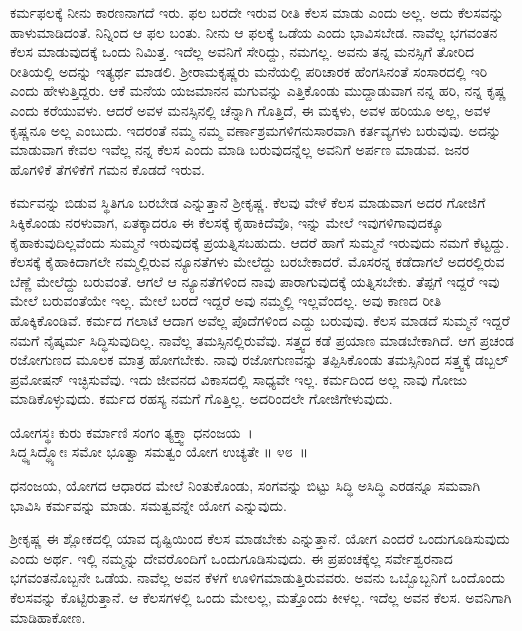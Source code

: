 ಕರ್ಮಫಲಕ್ಕೆ ನೀನು ಕಾರಣನಾಗದೆ ಇರು. ಫಲ ಬರದೇ ಇರುವ ರೀತಿ ಕೆಲಸ ಮಾಡು ಎಂದು ಅಲ್ಲ. ಅದು ಕೆಲಸವನ್ನು ಹಾಳುಮಾಡಿದಂತೆ. ನಿನ್ನಿಂದ ಆ ಫಲ ಬಂತು. ನೀನು ಆ ಫಲಕ್ಕೆ ಒಡೆಯ ಎಂದು ಭಾವಿಸಬೇಡ. ನಾವೆಲ್ಲ ಭಗವಂತನ ಕೆಲಸ ಮಾಡುವುದಕ್ಕೆ ಒಂದು ನಿಮಿತ್ತ. ಇದೆಲ್ಲ ಅವನಿಗೆ ಸೇರಿದ್ದು, ನಮಗಲ್ಲ. ಅವನು ತನ್ನ ಮನಸ್ಸಿಗೆ ತೋರಿದ ರೀತಿಯಲ್ಲಿ ಅದನ್ನು ಇತ್ಯರ್ಥ ಮಾಡಲಿ. ಶ‍್ರೀರಾಮಕೃಷ್ಣರು ಮನೆಯಲ್ಲಿ ಪರಿಚಾರಕ ಹೆಂಗಸಿನಂತೆ ಸಂಸಾರದಲ್ಲಿ ಇರಿ ಎಂದು ಹೇಳುತ್ತಿದ್ದರು. ಆಕೆ ಮನೆಯ ಯಜಮಾನನ ಮಗುವನ್ನು ಎತ್ತಿಕೊಂಡು ಮುದ್ದಾಡುವಾಗ ನನ್ನ ಹರಿ, ನನ್ನ ಕೃಷ್ಣ ಎಂದು ಕರೆಯುವಳು. ಆದರೆ ಅವಳ ಮನಸ್ಸಿನಲ್ಲಿ ಚೆನ್ನಾಗಿ ಗೊತ್ತಿದೆ, ಈ ಮಕ್ಕಳು, ಅವಳ ಹರಿಯೂ ಅಲ್ಲ, ಅವಳ ಕೃಷ್ಣನೂ ಅಲ್ಲ ಎಂಬುದು. ಇದರಂತೆ ನಮ್ಮ ನಮ್ಮ ವರ್ಣಾಶ್ರಮಗಳಿಗನುಸಾರವಾಗಿ ಕರ್ತವ್ಯಗಳು ಬರುವುವು. ಅದನ್ನು ಮಾಡುವಾಗ ಕೇವಲ ಇವೆಲ್ಲ ನನ್ನ ಕೆಲಸ ಎಂದು ಮಾಡಿ ಬರುವುದನ್ನೆಲ್ಲ ಅವನಿಗೆ ಅರ್ಪಣ ಮಾಡುವ. ಜನರ ಹೊಗಳಿಕೆ ತೆಗಳಿಕೆಗೆ ಗಮನ ಕೊಡದೆ ಇರುವ.

ಕರ್ಮವನ್ನು ಬಿಡುವ ಸ್ಥಿತಿಗೂ ಬರಬೇಡ ಎನ್ನುತ್ತಾನೆ ಶ‍್ರೀಕೃಷ್ಣ. ಕೆಲವು ವೇಳೆ ಕೆಲಸ ಮಾಡುವಾಗ ಅದರ ಗೋಜಿಗೆ ಸಿಕ್ಕಿಕೊಂಡು ನರಳುವಾಗ, ಏತಕ್ಕಾದರೂ ಈ ಕೆಲಸಕ್ಕೆ ಕೈಹಾಕಿದೆವೊ, ಇನ್ನು ಮೇಲೆ ಇವುಗಳಿಗಾವುದಕ್ಕೂ ಕೈಹಾಕುವುದಿಲ್ಲವೆಂದು ಸುಮ್ಮನೆ ಇರುವುದಕ್ಕೆ ಪ್ರಯತ್ನಿಸಬಹುದು. ಆದರೆ ಹಾಗೆ ಸುಮ್ಮನೆ ಇರುವುದು ನಮಗೆ ಕೆಟ್ಟದ್ದು. ಕೆಲಸಕ್ಕೆ ಕೈಹಾಕಿದಾಗಲೇ ನಮ್ಮಲ್ಲಿರುವ ನ್ಯೂನತೆಗಳು ಮೇಲೆದ್ದು ಬರಬೇಕಾದರೆ. ಮೊಸರನ್ನ ಕಡೆದಾಗಲೆ ಅದರಲ್ಲಿರುವ ಬೆಣ್ಣೆ ಮೇಲೆದ್ದು ಬರುವಂತೆ. ಆಗಲೆ ಆ ನ್ಯೂನತೆಗಳಿಂದ ನಾವು ಪಾರಾಗುವುದಕ್ಕೆ ಯತ್ನಿಸಬೇಕು. ತೆಪ್ಪಗೆ ಇದ್ದರೆ ಇವು ಮೇಲೆ ಬರುವಂತೆಯೇ ಇಲ್ಲ. ಮೇಲೆ ಬರದೆ ಇದ್ದರೆ ಅವು ನಮ್ಮಲ್ಲಿ ಇಲ್ಲವೆಂದಲ್ಲ. ಅವು ಕಾಣದ ರೀತಿ ಹೊಕ್ಕಿಕೊಂಡಿವೆ. ಕರ್ಮದ ಗಲಾಟೆ ಆದಾಗ ಅವೆಲ್ಲ ಪೊದೆಗಳಿಂದ ಎದ್ದು ಬರುವುವು. ಕೆಲಸ ಮಾಡದೆ ಸುಮ್ಮನೆ ಇದ್ದರೆ ನಮಗೆ ನೈಷ್ಕರ್ಮ ಸಿದ್ಧಿಸುವುದಿಲ್ಲ. ನಾವೆಲ್ಲ ತಮಸ್ಸಿನಲ್ಲಿರುವೆವು. ಸತ್ತ್ವದ ಕಡೆ ಪ್ರಯಾಣ ಮಾಡಬೇಕಾಗಿದೆ. ಆಗ ಪ್ರಚಂಡ ರಜೋಗುಣದ ಮೂಲಕ ಮಾತ್ರ ಹೋಗಬೇಕು. ನಾವು ರಜೋಗುಣವನ್ನು ತಪ್ಪಿಸಿಕೊಂಡು ತಮಸ್ಸಿನಿಂದ ಸತ್ತ್ವಕ್ಕೆ ಡಬ್ಬಲ್ ಪ್ರಮೋಷನ್ ಇಚ್ಛಿಸುವೆವು. ಇದು ಜೀವನದ ವಿಕಾಸದಲ್ಲಿ ಸಾಧ್ಯವೇ ಇಲ್ಲ. ಕರ್ಮದಿಂದ ಅಲ್ಲ ನಾವು ಗೋಜು ಮಾಡಿಕೊಳ್ಳುವುದು. ಕರ್ಮದ ರಹಸ್ಯ ನಮಗೆ ಗೊತ್ತಿಲ್ಲ. ಅದರಿಂದಲೇ ಗೋಜಿಗೇಳುವುದು.

\begin{shloka}
ಯೋಗಸ್ಥಃ ಕುರು ಕರ್ಮಾಣಿ ಸಂಗಂ ತ್ಯಕ್ತ್ವಾ ಧನಂಜಯ~।\\ಸಿದ್ಧ್ಯಸಿದ್ಧ್ಯೋಃ ಸಮೋ ಭೂತ್ವಾ ಸಮತ್ವಂ ಯೋಗ ಉಚ್ಯತೇ \hfill॥ ೪೮~॥
\end{shloka}

\begin{artha}
ಧನಂಜಯ, ಯೋಗದ ಆಧಾರದ ಮೇಲೆ ನಿಂತುಕೊಂಡು, ಸಂಗವನ್ನು ಬಿಟ್ಟು ಸಿದ್ಧಿ ಅಸಿದ್ಧಿ ಎರಡನ್ನೂ ಸಮವಾಗಿ ಭಾವಿಸಿ ಕರ್ಮವನ್ನು ಮಾಡು. ಸಮತ್ವವನ್ನೇ ಯೋಗ ಎನ್ನುವುದು.
\end{artha}

ಶ‍್ರೀಕೃಷ್ಣ ಈ ಶ್ಲೋಕದಲ್ಲಿ ಯಾವ ದೃಷ್ಟಿಯಿಂದ ಕೆಲಸ ಮಾಡಬೇಕು ಎನ್ನುತ್ತಾನೆ. ಯೋಗ ಎಂದರೆ ಒಂದುಗೂಡಿಸುವುದು ಎಂದು ಅರ್ಥ. ಇಲ್ಲಿ ನಮ್ಮನ್ನು ದೇವರೊಂದಿಗೆ ಒಂದುಗೂಡಿಸುವುದು. ಈ ಪ್ರಪಂಚಕ್ಕೆಲ್ಲ ಸರ್ವೇಶ್ವರನಾದ ಭಗವಂತನೊಬ್ಬನೇ ಒಡೆಯ. ನಾವೆಲ್ಲ ಅವನ ಕೆಳಗೆ ಊಳಿಗಮಾಡುತ್ತಿರುವವರು. ಅವನು ಒಬ್ಬೊಬ್ಬನಿಗೆ ಒಂದೊಂದು ಕೆಲಸವನ್ನು ಕೊಟ್ಟಿರುತ್ತಾನೆ. ಆ ಕೆಲಸಗಳಲ್ಲಿ ಒಂದು ಮೇಲಲ್ಲ, ಮತ್ತೊಂದು ಕೀಳಲ್ಲ. ಇದೆಲ್ಲ ಅವನ ಕೆಲಸ. ಅವನಿಗಾಗಿ ಮಾಡಿಹಾಕೋಣ.

